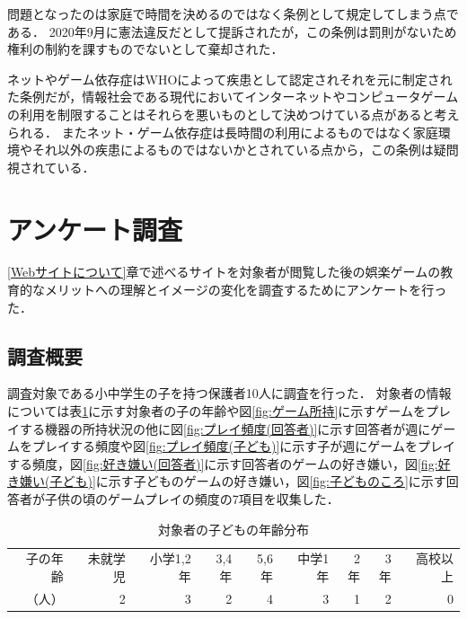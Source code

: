 \documentclass[12pt,a4j,titlepage]{ltjsarticle}
\begin{document}
問題となったのは家庭で時間を決めるのではなく条例として規定してしまう点である．
2020年9月に憲法違反だとして提訴されたが，この条例は罰則がないため権利の制約を課すものでないとして棄却された．

ネットやゲーム依存症はWHOによって疾患として認定されそれを元に制定された条例だが，情報社会である現代においてインターネットやコンピュータゲームの利用を制限することはそれらを悪いものとして決めつけている点があると考えられる．
またネット・ゲーム依存症は長時間の利用によるものではなく家庭環境やそれ以外の疾患によるものではないかとされている点から，この条例は疑問視されている．


\clearpage
\section{アンケート調査}\label{アンケート調査}
\ref{Webサイトについて}章で述べるサイトを対象者が閲覧した後の娯楽ゲームの教育的なメリットへの理解とイメージの変化を調査するためにアンケートを行った．

\subsection{調査概要}
調査対象である小中学生の子を持つ保護者10人に調査を行った．
対象者の情報については表\ref{table:情報}に示す対象者の子の年齢や図\ref{fig:ゲーム所持}に示すゲームをプレイする機器の所持状況の他に図\ref{fig:プレイ頻度(回答者)}に示す回答者が週にゲームをプレイする頻度や図\ref{fig:プレイ頻度(子ども)}に示す子が週にゲームをプレイする頻度，図\ref{fig:好き嫌い(回答者)}に示す回答者のゲームの好き嫌い，図\ref{fig:好き嫌い(子ども)}に示す子どものゲームの好き嫌い，図\ref{fig:子どものころ}に示す回答者が子供の頃のゲームプレイの頻度の7項目を収集した．

\begin{table}[H]
 \caption{対象者の子どもの年齢分布}
 \label{table:情報}
 \small
 \centering
  \begin{tabular}{rrrrrrrrr}
  \hline
   子の年齢 & 未就学児 & 小学1,2年 & 3,4年 & 5,6年 & 中学1年 & 2年 & 3年 & 高校以上\\
   （人）& 2 & 3 & 2 & 4 & 3 & 1 & 2 & 0\\
   \hline
  \end{tabular}
\end{table}
\end{document}

